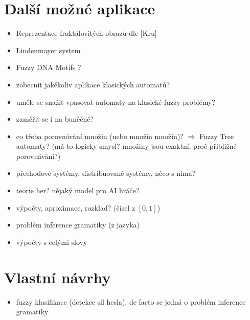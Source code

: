\documentclass[a4paper,10pt]{article}
\begin{document}
\section{Další možné aplikace}
\begin{itemize}
 \item Reprezentace fraktálovitých obrazů dle [Kru]
 \item Lindenmayer system
 \item Fuzzy DNA Motifs ?
 \item zobecnit jakékoliv aplikace klasických automatů?
 \item uměle se snažit vpasovat automaty na klasické fuzzy problémy?
 \item zaměřit se i na buněčné?
 \item co třeba porovnávání množin (nebo množin množin)? $\Rightarrow$ Fuzzy Tree automaty? (má to logicky smysl? množiny jsou exaktní, proč přibližné porovnávání?)
 \item přechodové systémy, distribuované systémy, něco s nima?
 \item teorie her? nějaký model pro AI hráče?
 \item výpočty, aproximace, rozklad? (čísel z $[0,1]$)
 \item problém inference gramatiky (z jazyka)
 \item výpočty s celými slovy
\end{itemize}

\section{Vlastní návrhy}
\begin{itemize}
 \item fuzzy  klasifikace (detekce síl hesla), de facto se jedná o problém inference gramatiky
 
\end{itemize}
\end{document}
